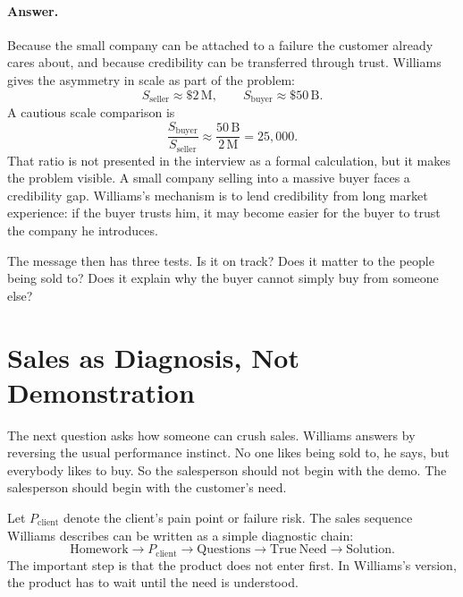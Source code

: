 \paragraph{Answer.} Because the small company can be attached to a failure the customer already cares about, and because credibility can be transferred through trust. Williams gives the asymmetry in scale as part of the problem:
\begin{equation}
S_{\mathrm{seller}} \approx \$2\,\mathrm{M},
\qquad
S_{\mathrm{buyer}} \approx \$50\,\mathrm{B}.
\end{equation}
A cautious scale comparison is
\begin{equation}
\frac{S_{\mathrm{buyer}}}{S_{\mathrm{seller}}}
\approx
\frac{50\,\mathrm{B}}{2\,\mathrm{M}}
=
25{,}000.
\end{equation}
That ratio is not presented in the interview as a formal calculation, but it makes the problem visible. A small company selling into a massive buyer faces a credibility gap. Williams's mechanism is to lend credibility from long market experience: if the buyer trusts him, it may become easier for the buyer to trust the company he introduces.

The message then has three tests. Is it on track? Does it matter to the people being sold to? Does it explain why the buyer cannot simply buy from someone else?

\section{Sales as Diagnosis, Not Demonstration}

The next question asks how someone can crush sales. Williams answers by reversing the usual performance instinct. No one likes being sold to, he says, but everybody likes to buy. So the salesperson should not begin with the demo. The salesperson should begin with the customer's need.

Let \(P_{\mathrm{client}}\) denote the client's pain point or failure risk. The sales sequence Williams describes can be written as a simple diagnostic chain:
\begin{equation}
\mathrm{Homework}
\longrightarrow
P_{\mathrm{client}}
\longrightarrow
\mathrm{Questions}
\longrightarrow
\mathrm{True\ Need}
\longrightarrow
\mathrm{Solution}.
\end{equation}
The important step is that the product does not enter first. In Williams's version, the product has to wait until the need is understood.

